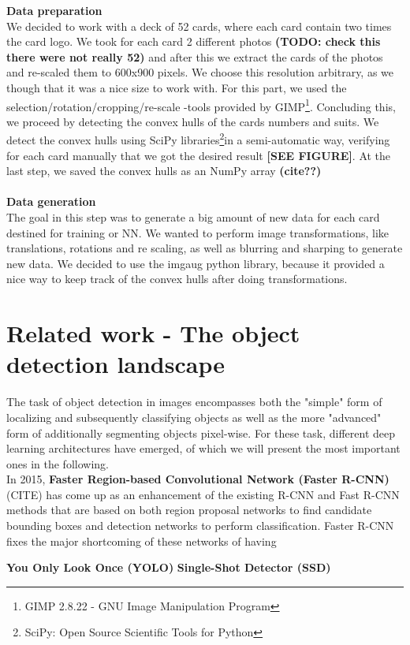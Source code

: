 \documentclass[a4paper]{article}
\begin{document}
\large \textbf{Data preparation} \\
\normalsize
We decided to work with a deck of 52 cards, where each card contain two times the card logo.  We took for each card 2 different photos \textbf{(TODO: check this there were not really 52)} and after this we extract the cards of the photos and re-scaled them to 600x900 pixels.  We choose this resolution arbitrary, as we though that it was a nice size to work with.
For this part, we used the selection/rotation/cropping/re-scale -tools provided by GIMP\footnote{GIMP 2.8.22 - GNU Image Manipulation Program}.
Concluding this, we proceed by detecting the convex hulls of the cards numbers and suits.  We detect the convex hulls using SciPy libraries\footnote{SciPy: Open Source Scientific Tools for Python}in a semi-automatic way, verifying for each card manually that we got the desired result \textbf{[SEE FIGURE]}.
At the last step, we saved the convex hulls as an NumPy array \textbf{(cite??)} \\ \\
\large \textbf{Data generation} \\
\normalsize
The goal in this step was to generate a big amount of new data for each card destined for training or NN. We wanted to perform image transformations, like translations, rotations and re scaling, as well as blurring and sharping to generate new data.  We decided to use the imgaug python library, because it provided a nice way to keep track of the convex hulls after doing transformations. 
\section{Related work - The object detection landscape}
The task of object detection in images encompasses both the "simple" form of localizing and subsequently classifying objects as well as the more "advanced" form of additionally segmenting objects pixel-wise. For these task, different deep learning architectures have emerged, of which we will present the most important ones in the following.\\ In 2015, \textbf{Faster Region-based Convolutional Network (Faster R-CNN)} (CITE) has come up as an enhancement of the existing R-CNN and Fast R-CNN methods that are based on both region proposal networks to find candidate bounding boxes and detection networks to perform classification. Faster R-CNN fixes the major shortcoming of these networks of having 


\textbf{You Only Look Once (YOLO)}
\textbf{Single-Shot Detector (SSD)}
\end{document}
